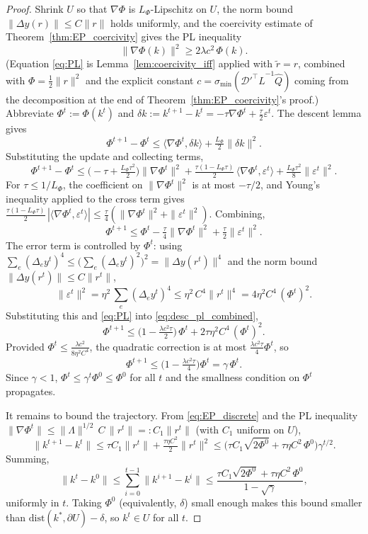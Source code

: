 \documentclass{siamart}
\begin{document}
\begin{proof}
Shrink $U$ so that $\nabla \Phi$ is $L_\Phi$-Lipschitz on $U$, the norm bound $\|\Delta y(r)\| \le C\|r\|$ holds uniformly, and the coercivity estimate of Theorem~\ref{thm:EP_coercivity} gives the PL inequality
\begin{equation}\label{eq:PL}
\|\nabla \Phi(k)\|^2 \ge 2\lambda c^2\,\Phi(k).
\end{equation}
(Equation \eqref{eq:PL} is Lemma~\ref{lem:coercivity_iff} applied with $\tilde r = r$, combined with $\Phi = \tfrac{1}{2}\|r\|^2$ and the explicit constant $c = \sigma_{\min}(\mathscr{D}'^\top\hat{L}^{-1}\hat{Q})$ coming from the decomposition at the end of Theorem~\ref{thm:EP_coercivity}'s proof.) Abbreviate $\Phi^t := \Phi(k^t)$ and $\delta k := k^{t+1} - k^t = -\tau \nabla \Phi^t + \tfrac{\tau}{2}\varepsilon^t$. The descent lemma gives
\[
\Phi^{t+1} - \Phi^t \le \langle \nabla\Phi^t, \delta k\rangle + \tfrac{L_\Phi}{2}\|\delta k\|^2.
\]
Substituting the update and collecting terms,
\[
\Phi^{t+1} - \Phi^t \le \bigl(-\tau + \tfrac{L_\Phi\tau^2}{2}\bigr)\|\nabla\Phi^t\|^2 + \tfrac{\tau(1 - L_\Phi\tau)}{2}\,\langle \nabla\Phi^t, \varepsilon^t\rangle + \tfrac{L_\Phi\tau^2}{8}\|\varepsilon^t\|^2.
\]
For $\tau \le 1/L_\Phi$, the coefficient on $\|\nabla\Phi^t\|^2$ is at most $-\tau/2$, and Young's inequality applied to the cross term gives $\tfrac{\tau(1 - L_\Phi\tau)}{2}\,|\langle \nabla\Phi^t, \varepsilon^t\rangle| \le \tfrac{\tau}{4}(\|\nabla\Phi^t\|^2 + \|\varepsilon^t\|^2)$. Combining,
\begin{equation}\label{eq:desc_pl_combined}
\Phi^{t+1} \le \Phi^t - \tfrac{\tau}{4}\|\nabla\Phi^t\|^2 + \tfrac{\tau}{2}\|\varepsilon^t\|^2.
\end{equation}
The error term is controlled by $\Phi^t$: using $\sum_e (\Delta_e y^t)^4 \le \bigl(\sum_e (\Delta_e y^t)^2\bigr)^2 = \|\Delta y(r^t)\|^4$ and the norm bound $\|\Delta y(r^t)\| \le C\|r^t\|$,
\[
\|\varepsilon^t\|^2 = \eta^2\,\sum_e (\Delta_e y^t)^4 \le \eta^2\,C^4\|r^t\|^4 = 4\eta^2 C^4\,(\Phi^t)^2.
\]
Substituting this and \eqref{eq:PL} into \eqref{eq:desc_pl_combined},
\[
\Phi^{t+1} \le \bigl(1 - \tfrac{\lambda c^2\tau}{2}\bigr)\,\Phi^t + 2\tau\eta^2 C^4\,(\Phi^t)^2.
\]
Provided $\Phi^t \le \tfrac{\lambda c^2}{8\eta^2 C^4}$, the quadratic correction is at most $\tfrac{\lambda c^2\tau}{4}\Phi^t$, so
\[
\Phi^{t+1} \le \bigl(1 - \tfrac{\lambda c^2\tau}{4}\bigr)\Phi^t = \gamma\,\Phi^t.
\]
Since $\gamma < 1$, $\Phi^t \le \gamma^t\Phi^0 \le \Phi^0$ for all $t$ and the smallness condition on $\Phi^t$ propagates.

It remains to bound the trajectory. From \eqref{eq:EP_discrete} and the PL inequality $\|\nabla\Phi^t\| \le \|\Lambda\|^{1/2}\,C\,\|r^t\| =: C_1\|r^t\|$ (with $C_1$ uniform on $U$),
\[
\|k^{t+1} - k^t\| \le \tau C_1\|r^t\| + \tfrac{\tau\eta C^2}{2}\|r^t\|^2 \le \bigl(\tau C_1\sqrt{2\Phi^0} + \tau\eta C^2\,\Phi^0\bigr)\gamma^{t/2}.
\]
Summing,
\[
\|k^t - k^0\| \le \sum_{i=0}^{t-1}\|k^{i+1} - k^i\| \le \frac{\tau C_1\sqrt{2\Phi^0} + \tau\eta C^2\,\Phi^0}{1 - \sqrt{\gamma}},
\]
uniformly in $t$. Taking $\Phi^0$ (equivalently, $\delta$) small enough makes this bound smaller than $\mathrm{dist}(k^*, \partial U) - \delta$, so $k^t \in U$ for all $t$.
\end{proof}
\end{document}
